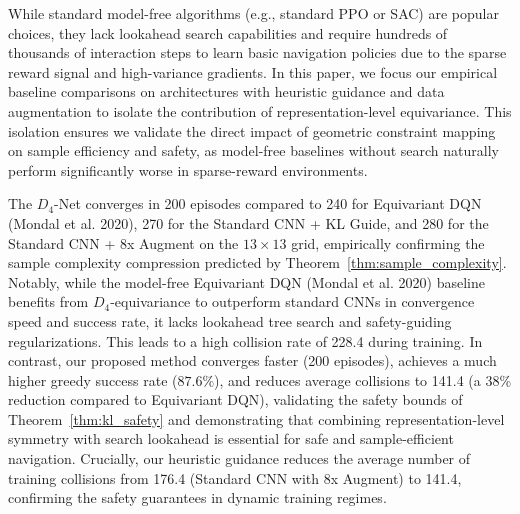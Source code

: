 \documentclass{article}
\begin{document}
While standard model-free algorithms (e.g., standard PPO or SAC) are popular choices, they lack lookahead search capabilities and require hundreds of thousands of interaction steps to learn basic navigation policies due to the sparse reward signal and high-variance gradients. In this paper, we focus our empirical baseline comparisons on architectures with heuristic guidance and data augmentation to isolate the contribution of representation-level equivariance. This isolation ensures we validate the direct impact of geometric constraint mapping on sample efficiency and safety, as model-free baselines without search naturally perform significantly worse in sparse-reward environments.

\begin{table}[H]
\centering
\vskip 0.1in
\caption{Quantitative Performance and Convergence Comparison on Unseen Maps ($13 \times 13$ Grid, 5 Seeds)}
\label{tab:results}
\end{table}

The $D_4$-Net converges in 200 episodes compared to 240 for Equivariant DQN (Mondal et al. 2020), 270 for the Standard CNN + KL Guide, and 280 for the Standard CNN + 8x Augment on the $13 \times 13$ grid, empirically confirming the sample complexity compression predicted by Theorem~\ref{thm:sample_complexity}. Notably, while the model-free Equivariant DQN (Mondal et al. 2020) baseline benefits from $D_4$-equivariance to outperform standard CNNs in convergence speed and success rate, it lacks lookahead tree search and safety-guiding regularizations. This leads to a high collision rate of 228.4 during training. In contrast, our proposed method converges faster (200 episodes), achieves a much higher greedy success rate ($87.6\%$), and reduces average collisions to 141.4 (a 38\% reduction compared to Equivariant DQN), validating the safety bounds of Theorem~\ref{thm:kl_safety} and demonstrating that combining representation-level symmetry with search lookahead is essential for safe and sample-efficient navigation. Crucially, our heuristic guidance reduces the average number of training collisions from 176.4 (Standard CNN with 8x Augment) to 141.4, confirming the safety guarantees in dynamic training regimes.
\end{document}
